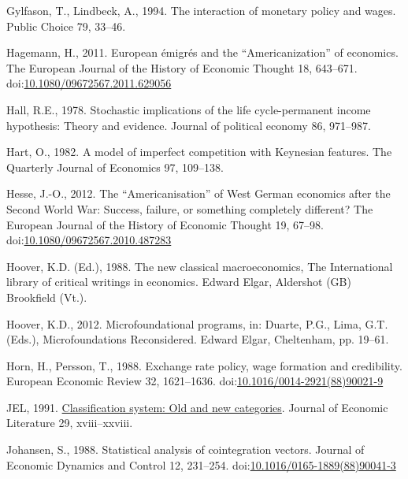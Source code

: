\documentclass[
  12pt,
  onecolumn]{article}
\newlength{\cslhangindent}
\newlength{\cslentryspacingunit} %
\newenvironment{CSLReferences}[2] %
 {%
  \setlength{\parindent}{0pt}
  \ifodd #1
  \let\oldpar\par
  \def\par{\hangindent=\cslhangindent\oldpar}
  \fi
  \setlength{\parskip}{#2\cslentryspacingunit}
 }%
 {}
\begin{document}
\begin{CSLReferences}{1}{0}
\leavevmode{}%
Gylfason, T., Lindbeck, A., 1994. The interaction of monetary policy and wages. Public Choice 79, 33--46.

\leavevmode{}%
Hagemann, H., 2011. European émigrés and the {``{Americanization}''} of economics. The European Journal of the History of Economic Thought 18, 643--671. doi:\href{https://doi.org/10.1080/09672567.2011.629056}{10.1080/09672567.2011.629056}

\leavevmode{}%
Hall, R.E., 1978. Stochastic implications of the life cycle-permanent income hypothesis: Theory and evidence. Journal of political economy 86, 971--987.

\leavevmode{}%
Hart, O., 1982. A model of imperfect competition with {Keynesian} features. The Quarterly Journal of Economics 97, 109--138.

\leavevmode{}%
Hesse, J.-O., 2012. The {``{Americanisation}''} of {West German} economics after the {Second World War}: {Success}, failure, or something completely different? The European Journal of the History of Economic Thought 19, 67--98. doi:\href{https://doi.org/10.1080/09672567.2010.487283}{10.1080/09672567.2010.487283}

\leavevmode{}%
Hoover, K.D. (Ed.), 1988. The new classical macroeconomics, The {International} library of critical writings in economics. Edward Elgar, Aldershot (GB) Brookfield (Vt.).

\leavevmode{}%
Hoover, K.D., 2012. Microfoundational programs, in: Duarte, P.G., Lima, G.T. (Eds.), Microfoundations {Reconsidered}. Edward Elgar, Cheltenham, pp. 19--61.

\leavevmode{}%
Horn, H., Persson, T., 1988. Exchange rate policy, wage formation and credibility. European Economic Review 32, 1621--1636. doi:\href{https://doi.org/10.1016/0014-2921(88)90021-9}{10.1016/0014-2921(88)90021-9}

\leavevmode{}%
JEL, 1991. \href{https://www.jstor.org/stable/2727351}{Classification system: Old and new categories}. Journal of Economic Literature 29, xviii--xxviii.

\leavevmode{}%
Johansen, S., 1988. Statistical analysis of cointegration vectors. Journal of Economic Dynamics and Control 12, 231--254. doi:\href{https://doi.org/10.1016/0165-1889(88)90041-3}{10.1016/0165-1889(88)90041-3}


\end{CSLReferences}
\end{document}
